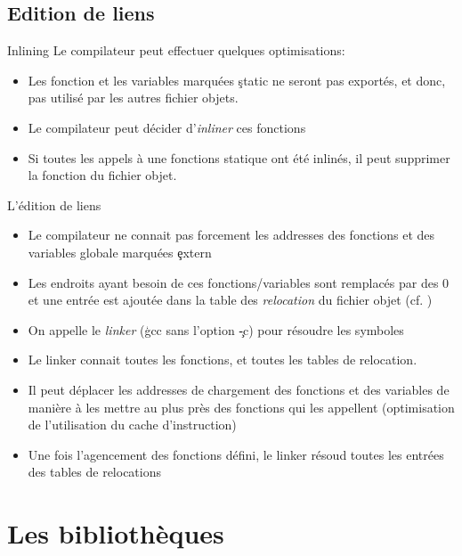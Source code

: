 \subsection{Edition de liens}

\begin{frame}[fragile=singleslide]{Inlining}
  Le compilateur peut effectuer quelques optimisations:
  \begin{itemize}
  \item Les  fonction et les  variables marquées \c{static}  ne seront
    pas exportés, et donc, pas utilisé par les autres fichier objets.
  \item  Le compilateur peut décider d'\emph{inliner} ces fonctions
  \item Si toutes les appels à une fonctions statique ont été inlinés,
    il peut supprimer la fonction du fichier objet.
  \end{itemize}
\end{frame}

\begin{frame}[fragile=singleslide]{L'édition de liens}
  \begin{itemize}
  \item  Le compilateur  ne connait  pas forcement  les  addresses des
    fonctions et des variables globale marquées \c{extern}
  \item  Les endroits  ayant  besoin de  ces fonctions/variables  sont
    remplacés par  des 0 et une  entrée est ajoutée dans  la table des
    \emph{relocation} du fichier objet (cf. )
  \item On  appelle le \emph{linker} (\c{gcc} sans  l'option \c{-c}) pour
    résoudre les symboles
  \item Le linker connait toutes les fonctions, et toutes les tables de
    relocation.
  \item Il peut déplacer les  addresses de chargement des fonctions et
    des variables de  manière à les mettre au  plus près des fonctions
    qui  les   appellent  (optimisation  de   l'utilisation  du  cache
    d'instruction)
  \item Une  fois l'agencement des fonctions défini,  le linker résoud
    toutes les entrées des tables de relocations
  \end{itemize}
\end{frame}

\section{Les bibliothèques}

